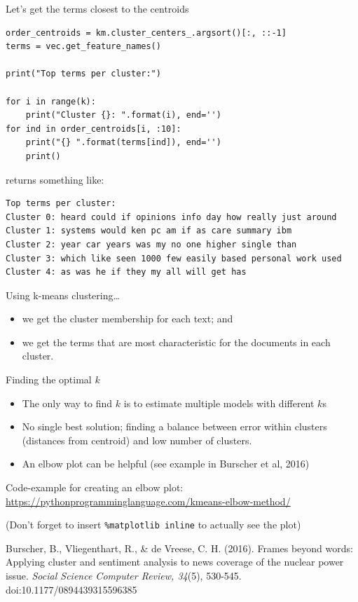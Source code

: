 \documentclass[compress]{beamer}
\begin{document}
\begin{frame}{Let's get the terms closest to the centroids}
\begin{lstlisting}
order_centroids = km.cluster_centers_.argsort()[:, ::-1]
terms = vec.get_feature_names()

print("Top terms per cluster:")

for i in range(k):
    print("Cluster {}: ".format(i), end='')
for ind in order_centroids[i, :10]:
    print("{} ".format(terms[ind]), end='')
    print()
\end{lstlisting}
\pause
returns something like:

\begin{lstlisting}
Top terms per cluster:
Cluster 0: heard could if opinions info day how really just around 
Cluster 1: systems would ken pc am if as care summary ibm 
Cluster 2: year car years was my no one higher single than 
Cluster 3: which like seen 1000 few easily based personal work used 
Cluster 4: as was he if they my all will get has 
\end{lstlisting}
\end{frame}


\begin{frame}{Using k-means clustering\ldots}
\begin{itemize}
\item we get the cluster membership for each text; and
\item we get the terms that are most characteristic for the documents in each cluster.
\end{itemize}
\end{frame}

\begin{frame}{Finding the optimal $k$}

\begin{itemize}
\item The only way to find $k$ is to estimate multiple models with different $k$s
\item No single best solution; finding a balance between error within clusters (distances from centroid) and low number of clusters.
\item An elbow plot can be helpful (see example in Burscher et al, 2016)
\end{itemize}

\pause

\footnotesize 
Code-example for creating an elbow plot:
\url{https://pythonprogramminglanguage.com/kmeans-elbow-method/}

(Don't forget to insert \texttt{\%matplotlib inline} to actually see the plot)


\tiny{Burscher, B., Vliegenthart, R., \& de Vreese, C. H. (2016). Frames beyond words: Applying cluster and sentiment analysis to news coverage of the
nuclear power issue.\textit{ Social Science Computer Review, 34}(5), 530-545. doi:10.1177/0894439315596385}
\end{frame}
\end{document}

